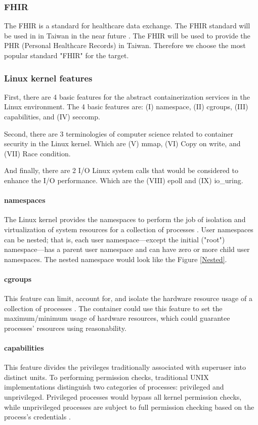 \documentclass[12pt,a4paper]{article}
\begin{document}
\subsubsection{FHIR}
The FHIR is a standard for healthcare data exchange. The FHIR standard will be used in
in Taiwan in the near future \cite{MOHW_FHIR}. The FHIR will be used to provide the PHR
(Personal Healthcare Records) in Taiwan. Therefore we choose the most popular standard
"FHIR" for the target.

\subsubsection{Linux kernel features}
First, there are 4 basic features for the abstract containerization services in the Linux
environment.
The 4 basic features are: (\RN{1}) namespace, (\RN{2}) cgroups, (\RN{3}) capabilities,
and (\RN{4}) seccomp.

Second, there are 3 terminologies of computer science related to container security in
the Linux kernel. Which are (\RN{5}) mmap, (\RN{6}) Copy on write, and (\RN{7}) Race condition.

And finally, there are 2 I/O Linux system calls that would be considered to enhance the I/O performance.
Which are the (\RN{8}) epoll and (\RN{9}) io\_uring.

\paragraph{namespaces}
The Linux kernel provides the namespaces to perform the job of isolation and virtualization
of system resources for a collection of processes \cite{Road_Ahead}.
User namespaces can be nested; that is, each user namespace—except the initial ("root")
namespace—has a parent user namespace and can have zero or more child user namespaces.
\cite{user_namespaces}
The nested namespace would look like the Figure \ref*{Nested}.

\paragraph{cgroups}
This feature can limit, account for, and isolate the hardware resource usage of a
collection of processes \cite{cgroup_wiki}.
The container could use this feature to set the maximum/minimum usage of hardware
resources, which could guarantee processes' resources using reasonability.

\paragraph{capabilities}
This feature divides the privileges traditionally associated with superuser into
distinct units. To performing permission checks, traditional UNIX
implementations distinguish two categories of processes: privileged and unprivileged.
Privileged processes would bypass all kernel permission checks, while unprivileged
processes are subject to full permission checking based on the process's credentials
\cite{capabilities}.
\end{document}
